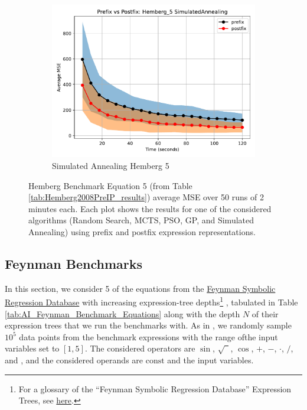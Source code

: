 \documentclass[12pt]{iopart}
\newcommand\specialcaret{%
  \stackengine{0pt}{\ \,}{\scalebox{1.1}[2]{\raisebox{-0.9ex}{\string^}}}{O}{c}{F}{T}{L}}
\begin{document}
\begin{figure}
    \vspace{0.5cm}
    
    \begin{subfigure}[b]{0.4\textwidth}
        \includegraphics[width=\linewidth, keepaspectratio]{Hemberg_Benchmarks/PrePostHemberg_5SimulatedAnnealing.pdf}
        \caption{Simulated Annealing Hemberg 5}
        \label{subfig:hemberg_5_SA}
    \end{subfigure}
    
    \caption{Hemberg Benchmark Equation 5 (from Table \ref{tab:Hemberg2008PreIP_results}) average MSE over 50 runs of 2 minutes each. Each plot shows the results for one of the considered algorithms (Random Search, MCTS, PSO, GP, and Simulated Annealing) using prefix and postfix expression representations.}
    \label{fig:Hemberg_5_Benchmarks}
\end{figure}

\subsection{Feynman Benchmarks} \label{subsec:FeynmanBenchmarks}
In this section, we consider 5 of the equations from the \href{https://space.mit.edu/home/tegmark/aifeynman.html}{Feynman Symbolic Regression Database} with increasing expression-tree depths\footnote{For a glossary of the ``Feynman Symbolic Regression Database'' Expression Trees, see \href{https://edfink234.github.io/AIFeynmanExpressionTrees/AIFeynmanExpressionTrees/AIFeynmanExpressionTrees}{here}.} 
, tabulated in Table \ref{tab:AI_Feynman_Benchmark_Equations} along with the depth $N$ of their expression trees that we run the benchmarks with. As in \cite{udrescu2020ai}, we randomly sample $10^5$ data points from the benchmark expressions with the range ofthe input variables set to $[1, 5]$. The considered operators are $\sin$, $\sqrt{\phantom{1}}$, $\cos$, $+$, $-$, $\cdot$, $/$, and \specialcaret, and the considered operands are $\mathrm{const}$ and the input variables. 
\end{document}
